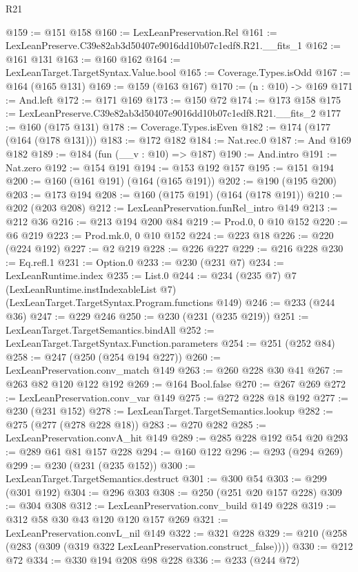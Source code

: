 \begin{lexlean}{R21}
\begin{coremodule}
@159 := @151 @158
@160 := LexLeanPreservation.Rel
@161 := LexLeanPreserve.C39e82ab3d50407e9016dd10b07c1edf8.R21.__fits_1
@162 := @161 @131
@163 := @160 @162
@164 := LexLeanTarget.TargetSyntax.Value.bool
@165 := Coverage.Types.isOdd
@167 := @164 (@165 @131)
@169 := @159 (@163 @167)
@170 := (n : @10) -> @169
@171 := And.left
@172 := @171 @169
@173 := @150 @72
@174 := @173 @158
@175 := LexLeanPreserve.C39e82ab3d50407e9016dd10b07c1edf8.R21.__fits_2
@177 := @160 (@175 @131)
@178 := Coverage.Types.isEven
@182 := @174 (@177 (@164 (@178 @131)))
@183 := @172 @182
@184 := Nat.rec.{0}
@187 := And @169 @182
@189 := @184 (fun (__v : @10) => @187)
@190 := And.intro
@191 := Nat.zero
@192 := @154 @191
@194 := @153 @192 @157
@195 := @151 @194
@200 := @160 (@161 @191) (@164 (@165 @191))
@202 := @190 (@195 @200)
@203 := @173 @194
@208 := @160 (@175 @191) (@164 (@178 @191))
@210 := @202 (@203 @208)
@212 := LexLeanPreservation.funRel_intro @149
@213 := @212 @36
@216 := @213 @194 @200 @84
@219 := Prod.{0, 0} @10 @152
@220 := @6 @219
@223 := Prod.mk.{0, 0} @10 @152
@224 := @223 @18
@226 := @220 (@224 @192)
@227 := @2 @219
@228 := @226 @227
@229 := @216 @228
@230 := Eq.refl.{1}
@231 := Option.{0}
@233 := @230 (@231 @7)
@234 := LexLeanRuntime.index
@235 := List.{0}
@244 := @234
    (@235 @7)
    @7
    (LexLeanRuntime.instIndexableList @7)
    (LexLeanTarget.TargetSyntax.Program.functions @149)
@246 := @233 (@244 @36)
@247 := @229 @246
@250 := @230 (@231 (@235 @219))
@251 := LexLeanTarget.TargetSemantics.bindAll
@252 := LexLeanTarget.TargetSyntax.Function.parameters
@254 := @251 (@252 @84)
@258 := @247 (@250 (@254 @194 @227))
@260 := LexLeanPreservation.conv_match @149
@263 := @260 @228 @30 @41
@267 := @263 @82 @120 @122 @192
@269 := @164 Bool.false
@270 := @267 @269
@272 := LexLeanPreservation.conv_var @149
@275 := @272 @228 @18 @192
@277 := @230 (@231 @152)
@278 := LexLeanTarget.TargetSemantics.lookup
@282 := @275 (@277 (@278 @228 @18))
@283 := @270 @282
@285 := LexLeanPreservation.convA_hit @149
@289 := @285 @228 @192 @54 @20
@293 := @289 @61 @81 @157 @228
@294 := @160 @122
@296 := @293 (@294 @269)
@299 := @230 (@231 (@235 @152))
@300 := LexLeanTarget.TargetSemantics.destruct
@301 := @300 @54
@303 := @299 (@301 @192)
@304 := @296 @303
@308 := @250 (@251 @20 @157 @228)
@309 := @304 @308
@312 := LexLeanPreservation.conv_build @149 @228
@319 := @312 @58 @30 @43 @120 @120 @157 @269
@321 := LexLeanPreservation.convL_nil @149
@322 := @321 @228
@329 := @210 (@258 (@283 (@309 (@319 @322 LexLeanPreservation.construct_false))))
@330 := @212 @72
@334 := @330 @194 @208 @98 @228
@336 := @233 (@244 @72)

\end{coremodule}
\end{lexlean}
